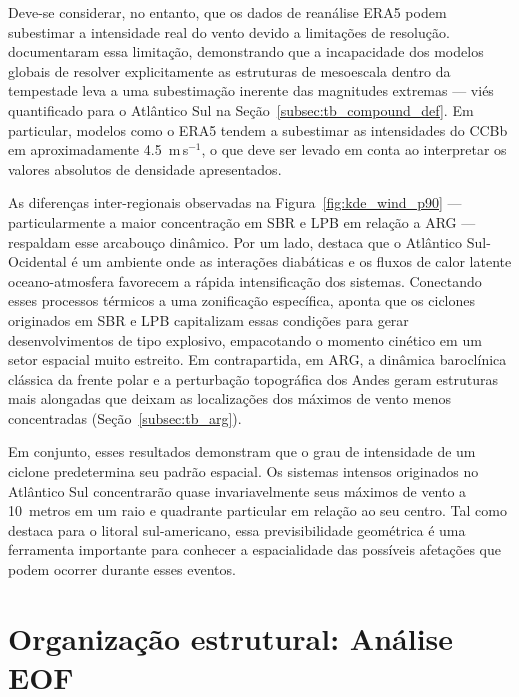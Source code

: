 Deve-se considerar, no entanto, que os dados de reanálise ERA5 podem subestimar a intensidade real do vento devido a limitações de resolução.
\citet{priestley2022improved} documentaram essa limitação, demonstrando que a incapacidade dos modelos globais de resolver explicitamente as estruturas de mesoescala dentro da tempestade leva a uma subestimação inerente das magnitudes extremas --- viés quantificado para o Atlântico Sul na Seção~\ref{subsec:tb_compound_def}.
Em particular, modelos como o ERA5 tendem a subestimar as intensidades do CCBb em aproximadamente 4.5~m\,s$^{-1}$, o que deve ser levado em conta ao interpretar os valores absolutos de densidade apresentados.

As diferenças inter-regionais observadas na Figura~\ref{fig:kde_wind_p90} --- particularmente a maior concentração em SBR e LPB em relação a ARG --- respaldam esse arcabouço dinâmico. Por um lado, \citet{reboita2018extratropical} destaca que o Atlântico Sul-Ocidental é um ambiente onde as interações diabáticas e os fluxos de calor latente oceano-atmosfera favorecem a rápida intensificação dos sistemas. Conectando esses processos térmicos a uma zonificação específica, \citet{gramcianinov2023impact} aponta que os ciclones originados em SBR e LPB capitalizam essas condições para gerar desenvolvimentos de tipo explosivo, empacotando o momento cinético em um setor espacial muito estreito. Em contrapartida, em ARG, a dinâmica baroclínica clássica da frente polar e a perturbação topográfica dos Andes geram estruturas mais alongadas que deixam as localizações dos máximos de vento menos concentradas (Seção~\ref{subsec:tb_arg}).

Em conjunto, esses resultados demonstram que o grau de intensidade de um ciclone predetermina seu padrão espacial. Os sistemas intensos originados no Atlântico Sul concentrarão quase invariavelmente seus máximos de vento a 10~metros em um raio e quadrante particular em relação ao seu centro. Tal como destaca \citet{dalanhese2023new} para o litoral sul-americano, essa previsibilidade geométrica é uma ferramenta importante para conhecer a espacialidade das possíveis afetações que podem ocorrer durante esses eventos.


\section{Organização estrutural: Análise EOF}\label{sec:eof_wind10}

